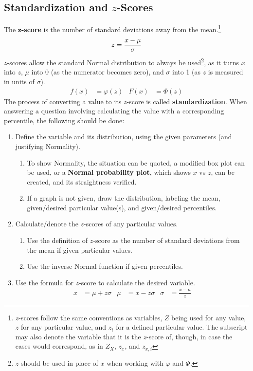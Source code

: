 \documentclass[../AP_Statistics.tex]{subfiles}
\begin{document}
			\subsection*{Standardization and $z$-Scores}
				The $\pmb{z}$\textbf{-score} is the number of standard deviations away from the mean.\footnote{$z$-scores follow the same conventions as variables, $Z$ being used for any value, $z$ for any particular value, and $z_i$ for a defined particular value. The subscript may also denote the variable that it is the $z$-score of, though, in case the cases would correspond, as in $Z_X$, $z_x$, and $z_{x,i}$}
				\[z = \frac{x - \mu}{\sigma}\]
				$z$-scores allow the standard Normal distribution to always be used\footnote{$z$ should be used in place of $x$ when working with $\varphi$ and $\Phi$.}, as it turns $x$ into $z$, $\mu$ into 0 (as the numerator becomes zero), and $\sigma$ into 1 (as $z$ is measured in units of $\sigma$).
				\begin{align*}
					f(x) &= \varphi(z) & F(x) &= \Phi(z)
				\end{align*}
				The process of converting a value to its $z$-score is called \textbf{standardization}.
				When answering a question involving calculating the value with a corresponding percentile, the following should be done:
				\begin{enumerate}
					\item Define the variable and its distribution, using the given parameters (and justifying Normality).
					\begin{enumerate}
						\item To show Normality, the situation can be quoted, a modified box plot can be used, or a \textbf{Normal probability plot}, which shows $x$ vs $z$, can be created, and its straightness verified.
						\item If a graph is not given, draw the distribution, labeling the mean, given/desired particular value(s), and given/desired percentiles.
					\end{enumerate}
					\item Calculate/denote the $z$-scores of any particular values.
					\begin{enumerate}
						\item Use the definition of $z$-score as the number of standard deviations from the mean if given particular values.
						\item Use the inverse Normal function if given percentiles.
					\end{enumerate}
					\item Use the formula for $z$-score to calculate the desired variable.
						\begin{align*}
							x &= \mu + z\sigma & \mu &= x - z\sigma & \sigma &= \frac{x - \mu}{z}
						\end{align*}
				\end{enumerate}
\end{document}
